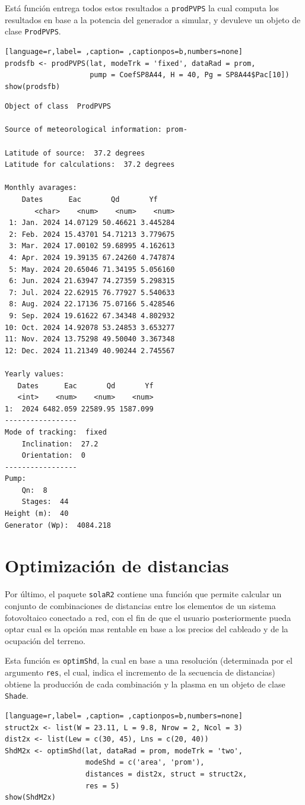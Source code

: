 \begin{itemize}
Está función entrega todos estos resultados a \texttt{prodPVPS} la cual computa los resultados en base a la potencia del generador a simular, y devuleve un objeto de clase \texttt{ProdPVPS}.
\begin{lstlisting}[language=r,label= ,caption= ,captionpos=b,numbers=none]
prodsfb <- prodPVPS(lat, modeTrk = 'fixed', dataRad = prom,
                    pump = CoefSP8A44, H = 40, Pg = SP8A44$Pac[10])
show(prodsfb)
\end{lstlisting}

\begin{verbatim}
Object of class  ProdPVPS 

Source of meteorological information: prom- 

Latitude of source:  37.2 degrees
Latitude for calculations:  37.2 degrees

Monthly avarages:
	Dates      Eac       Qd       Yf
       <char>    <num>    <num>    <num>
 1: Jan. 2024 14.07129 50.46621 3.445284
 2: Feb. 2024 15.43701 54.71213 3.779675
 3: Mar. 2024 17.00102 59.68995 4.162613
 4: Apr. 2024 19.39135 67.24260 4.747874
 5: May. 2024 20.65046 71.34195 5.056160
 6: Jun. 2024 21.63947 74.27359 5.298315
 7: Jul. 2024 22.62915 76.77927 5.540633
 8: Aug. 2024 22.17136 75.07166 5.428546
 9: Sep. 2024 19.61622 67.34348 4.802932
10: Oct. 2024 14.92078 53.24853 3.653277
11: Nov. 2024 13.75298 49.50040 3.367348
12: Dec. 2024 11.21349 40.90244 2.745567

Yearly values:
   Dates      Eac       Qd       Yf
   <int>    <num>    <num>    <num>
1:  2024 6482.059 22589.95 1587.099
-----------------
Mode of tracking:  fixed 
    Inclination:  27.2 
    Orientation:  0 
-----------------
Pump:
    Qn:  8 
    Stages:  44 
Height (m):  40 
Generator (Wp):  4084.218
\end{verbatim}
\end{itemize}

\section{Optimización de distancias}
\label{sec:org0e9680f}
\label{optimizacion-distancias}
Por último, el paquete \texttt{solaR2} contiene una función que permite calcular un conjunto de combinaciones de distancias entre los elementos de un sistema fotovoltaico conectado a red, con el fin de que el usuario posteriormente pueda optar cual es la opción mas rentable en base a los precios del cableado y de la ocupación del terreno.

Esta función es \texttt{optimShd}, la cual en base a una resolución (determinada por el argumento \texttt{res}, el cual, indica el incremento de la secuencia de distancias) obtiene la producción de cada combinación y la plasma en un objeto de clase \texttt{Shade}.
\begin{lstlisting}[language=r,label= ,caption= ,captionpos=b,numbers=none]
struct2x <- list(W = 23.11, L = 9.8, Nrow = 2, Ncol = 3)
dist2x <- list(Lew = c(30, 45), Lns = c(20, 40))
ShdM2x <- optimShd(lat, dataRad = prom, modeTrk = 'two',
                   modeShd = c('area', 'prom'),
                   distances = dist2x, struct = struct2x,
                   res = 5)
show(ShdM2x)
\end{lstlisting}

